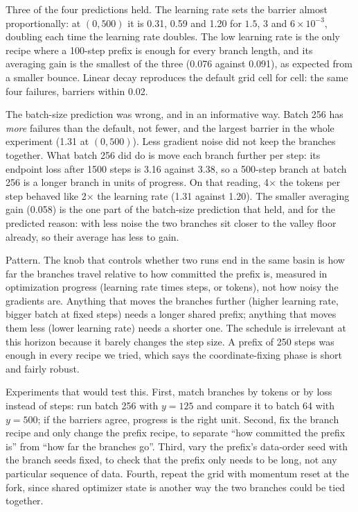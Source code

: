 \documentclass[10pt,letterpaper]{article}
\begin{document}
Three of the four predictions held. The learning rate sets the barrier almost proportionally: at $(0,500)$ it is 0.31, 0.59 and 1.20 for $1.5$, $3$ and $6\times10^{-3}$, doubling each time the learning rate doubles. The low learning rate is the only recipe where a 100-step prefix is enough for every branch length, and its averaging gain is the smallest of the three (0.076 against 0.091), as expected from a smaller bounce. Linear decay reproduces the default grid cell for cell: the same four failures, barriers within 0.02.

The batch-size prediction was wrong, and in an informative way. Batch 256 has \emph{more} failures than the default, not fewer, and the largest barrier in the whole experiment (1.31 at $(0,500)$). Less gradient noise did not keep the branches together. What batch 256 did do is move each branch further per step: its endpoint loss after 1500 steps is 3.16 against 3.38, so a 500-step branch at batch 256 is a longer branch in units of progress. On that reading, 4$\times$ the tokens per step behaved like 2$\times$ the learning rate (1.31 against 1.20). The smaller averaging gain (0.058) is the one part of the batch-size prediction that held, and for the predicted reason: with less noise the two branches sit closer to the valley floor already, so their average has less to gain.

Pattern. The knob that controls whether two runs end in the same basin is how far the branches travel relative to how committed the prefix is, measured in optimization progress (learning rate times steps, or tokens), not how noisy the gradients are. Anything that moves the branches further (higher learning rate, bigger batch at fixed steps) needs a longer shared prefix; anything that moves them less (lower learning rate) needs a shorter one. The schedule is irrelevant at this horizon because it barely changes the step size. A prefix of 250 steps was enough in every recipe we tried, which says the coordinate-fixing phase is short and fairly robust.

Experiments that would test this. First, match branches by tokens or by loss instead of steps: run batch 256 with $y=125$ and compare it to batch 64 with $y=500$; if the barriers agree, progress is the right unit. Second, fix the branch recipe and only change the prefix recipe, to separate ``how committed the prefix is'' from ``how far the branches go''. Third, vary the prefix's data-order seed with the branch seeds fixed, to check that the prefix only needs to be long, not any particular sequence of data. Fourth, repeat the grid with momentum reset at the fork, since shared optimizer state is another way the two branches could be tied together.
\end{document}
